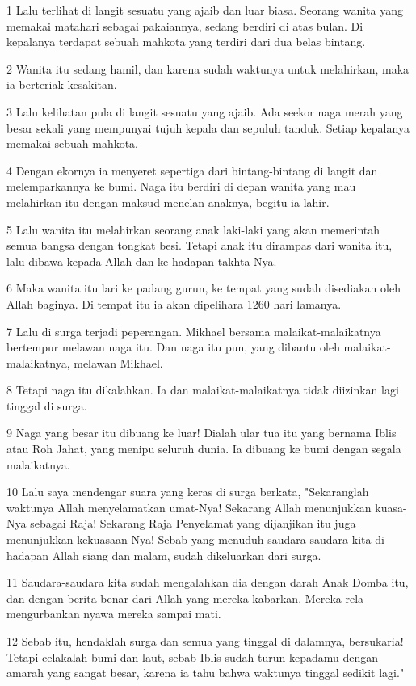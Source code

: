 \par 1 Lalu terlihat di langit sesuatu yang ajaib dan luar biasa. Seorang wanita yang memakai matahari sebagai pakaiannya, sedang berdiri di atas bulan. Di kepalanya terdapat sebuah mahkota yang terdiri dari dua belas bintang.
\par 2 Wanita itu sedang hamil, dan karena sudah waktunya untuk melahirkan, maka ia berteriak kesakitan.
\par 3 Lalu kelihatan pula di langit sesuatu yang ajaib. Ada seekor naga merah yang besar sekali yang mempunyai tujuh kepala dan sepuluh tanduk. Setiap kepalanya memakai sebuah mahkota.
\par 4 Dengan ekornya ia menyeret sepertiga dari bintang-bintang di langit dan melemparkannya ke bumi. Naga itu berdiri di depan wanita yang mau melahirkan itu dengan maksud menelan anaknya, begitu ia lahir.
\par 5 Lalu wanita itu melahirkan seorang anak laki-laki yang akan memerintah semua bangsa dengan tongkat besi. Tetapi anak itu dirampas dari wanita itu, lalu dibawa kepada Allah dan ke hadapan takhta-Nya.
\par 6 Maka wanita itu lari ke padang gurun, ke tempat yang sudah disediakan oleh Allah baginya. Di tempat itu ia akan dipelihara 1260 hari lamanya.
\par 7 Lalu di surga terjadi peperangan. Mikhael bersama malaikat-malaikatnya bertempur melawan naga itu. Dan naga itu pun, yang dibantu oleh malaikat-malaikatnya, melawan Mikhael.
\par 8 Tetapi naga itu dikalahkan. Ia dan malaikat-malaikatnya tidak diizinkan lagi tinggal di surga.
\par 9 Naga yang besar itu dibuang ke luar! Dialah ular tua itu yang bernama Iblis atau Roh Jahat, yang menipu seluruh dunia. Ia dibuang ke bumi dengan segala malaikatnya.
\par 10 Lalu saya mendengar suara yang keras di surga berkata, "Sekaranglah waktunya Allah menyelamatkan umat-Nya! Sekarang Allah menunjukkan kuasa-Nya sebagai Raja! Sekarang Raja Penyelamat yang dijanjikan itu juga menunjukkan kekuasaan-Nya! Sebab yang menuduh saudara-saudara kita di hadapan Allah siang dan malam, sudah dikeluarkan dari surga.
\par 11 Saudara-saudara kita sudah mengalahkan dia dengan darah Anak Domba itu, dan dengan berita benar dari Allah yang mereka kabarkan. Mereka rela mengurbankan nyawa mereka sampai mati.
\par 12 Sebab itu, hendaklah surga dan semua yang tinggal di dalamnya, bersukaria! Tetapi celakalah bumi dan laut, sebab Iblis sudah turun kepadamu dengan amarah yang sangat besar, karena ia tahu bahwa waktunya tinggal sedikit lagi."
